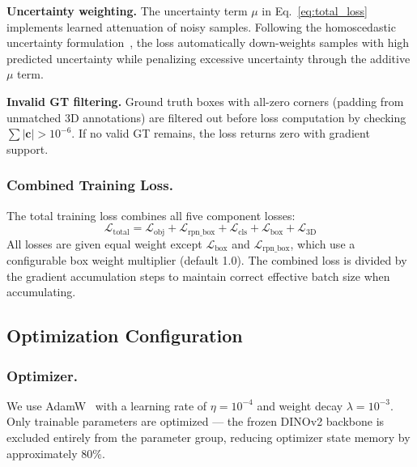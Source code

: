 \documentclass[runningheads]{llncs}
\begin{document}
\noindent\textbf{Uncertainty weighting.}
The uncertainty term $\mu$ in Eq.~\eqref{eq:total_loss} implements learned attenuation of noisy samples.
Following the homoscedastic uncertainty formulation~\cite{kendall2017uncertainties}, the loss automatically down-weights samples with high predicted uncertainty while penalizing excessive uncertainty through the additive $\mu$ term.

\noindent\textbf{Invalid GT filtering.}
Ground truth boxes with all-zero corners (padding from unmatched 3D annotations) are filtered out before loss computation by checking $\sum |\mathbf{c}| > 10^{-6}$.
If no valid GT remains, the loss returns zero with gradient support.

\subsubsection{Combined Training Loss.}
The total training loss combines all five component losses:
\begin{equation}
    \mathcal{L}_{\text{total}} = \mathcal{L}_{\text{obj}} + \mathcal{L}_{\text{rpn\_box}} + \mathcal{L}_{\text{cls}} + \mathcal{L}_{\text{box}} + \mathcal{L}_{\text{3D}}
\end{equation}
All losses are given equal weight except $\mathcal{L}_{\text{box}}$ and $\mathcal{L}_{\text{rpn\_box}}$, which use a configurable box weight multiplier (default 1.0).
The combined loss is divided by the gradient accumulation steps to maintain correct effective batch size when accumulating.


\subsection{Optimization Configuration}
\label{sec:optimization}

\subsubsection{Optimizer.}
We use AdamW~\cite{loshchilov2019adamw} with a learning rate of $\eta = 10^{-4}$ and weight decay $\lambda = 10^{-3}$.
Only trainable parameters are optimized --- the frozen DINOv2 backbone is excluded entirely from the parameter group, reducing optimizer state memory by approximately 80\%.
\end{document}
